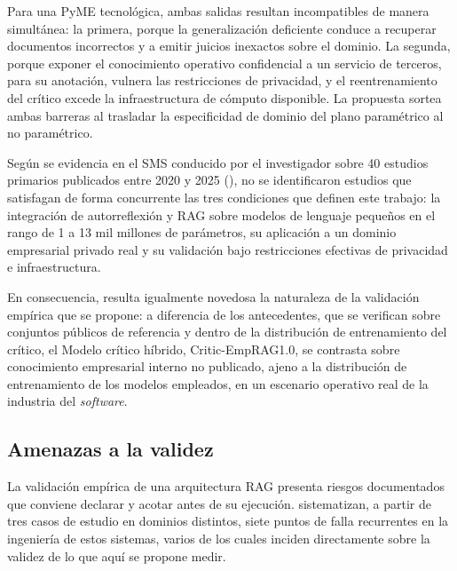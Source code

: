 Para una PyME tecnológica, ambas salidas resultan incompatibles de manera simultánea: la primera, porque la generalización deficiente conduce a recuperar documentos incorrectos y a emitir juicios inexactos sobre el dominio. La segunda, porque exponer el conocimiento operativo confidencial a un servicio de terceros, para su anotación, vulnera las restricciones de privacidad, y el reentrenamiento del crítico excede la infraestructura de cómputo disponible. La propuesta sortea ambas barreras al trasladar la especificidad de dominio del plano paramétrico al no paramétrico.

Según se evidencia en el SMS conducido por el investigador sobre 40 estudios primarios publicados entre 2020 y 2025 (\cite{Alcides2026}), no se identificaron estudios que satisfagan de forma concurrente las tres condiciones que definen este trabajo: la integración de autorreflexión y RAG sobre modelos de lenguaje pequeños en el rango de 1 a 13 mil millones de parámetros, su aplicación a un dominio empresarial privado real y su validación bajo restricciones efectivas de privacidad e infraestructura.

En consecuencia, resulta igualmente novedosa la naturaleza de la validación empírica que se propone: a diferencia de los antecedentes, que se verifican sobre conjuntos públicos de referencia y dentro de la distribución de entrenamiento del crítico, el Modelo crítico híbrido, Critic-EmpRAG1.0, se contrasta sobre conocimiento empresarial interno no publicado, ajeno a la distribución de entrenamiento de los modelos empleados, en un escenario operativo real de la industria del \textit{software}.

\subsection{Amenazas a la validez}

La validación empírica de una arquitectura RAG presenta riesgos documentados que conviene declarar y acotar antes de su ejecución. \textcite{Barnett2024_SevenFailurePoints} sistematizan, a partir de tres casos de estudio en dominios distintos, siete puntos de falla recurrentes en la ingeniería de estos sistemas, varios de los cuales inciden directamente sobre la validez de lo que aquí se propone medir.

